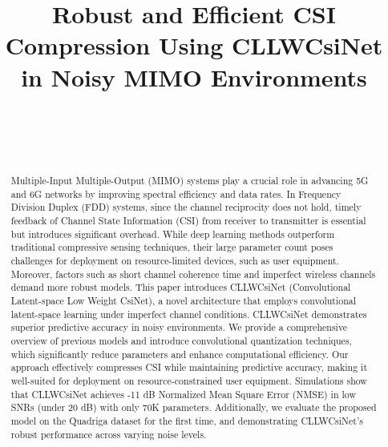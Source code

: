 \documentclass[lettersize,journal]{IEEEtran}
\begin{document}
\title{Robust and Efficient CSI Compression Using CLLWCsiNet in Noisy MIMO Environments}

\author{
	\\
	\\
	\\
}

\maketitle
\begin{abstract}
Multiple-Input Multiple-Output (MIMO) systems play a crucial role in advancing 5G and 6G networks by improving spectral efficiency and data rates. In Frequency Division Duplex (FDD) systems, since the channel reciprocity does not hold, timely feedback of Channel State Information (CSI) from receiver to transmitter is essential but introduces significant overhead. While deep learning methods outperform traditional compressive sensing techniques, their large parameter count poses challenges for deployment on resource-limited devices, such as user equipment. Moreover, factors such as short channel coherence time and imperfect wireless channels demand more robust models.
This paper introduces CLLWCsiNet (Convolutional Latent-space Low Weight CsiNet), a novel architecture that employs convolutional latent-space learning under imperfect channel conditions. CLLWCsiNet demonstrates superior predictive accuracy in noisy environments. We provide a comprehensive overview of previous models and introduce convolutional quantization techniques, which significantly reduce parameters and enhance computational efficiency. Our approach effectively compresses CSI while maintaining predictive accuracy, making it well-suited for deployment on resource-constrained user equipment.
Simulations show that CLLWCsiNet achieves -11 dB Normalized Mean Square Error (NMSE) in low SNRs (under 20 dB) with only 70K parameters. Additionally, we evaluate the proposed model on the Quadriga dataset for the first time, and demonstrating CLLWCsiNet's robust performance across varying noise levels.

\end{abstract}
\end{document}
